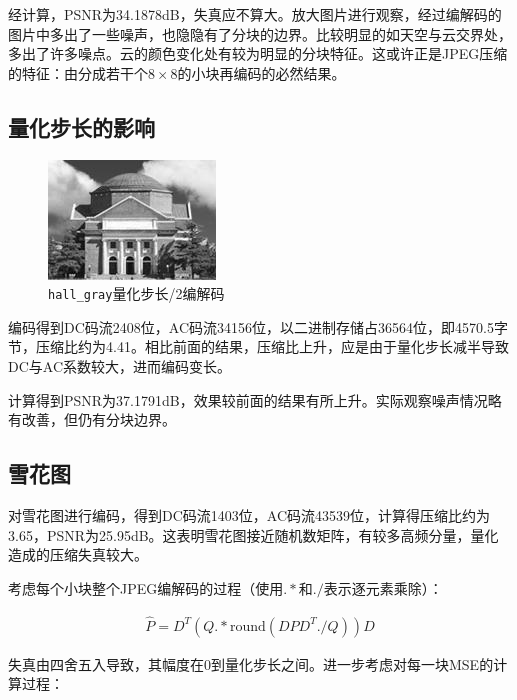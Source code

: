 \documentclass[10pt, a4paper]{article}
\begin{document}
经计算，PSNR为34.1878dB，失真应不算大。放大图片进行观察，经过编解码的图片中多出了一些噪声，也隐隐有了分块的边界。比较明显的如天空与云交界处，多出了许多噪点。云的颜色变化处有较为明显的分块特征。这或许正是JPEG压缩的特征：由分成若干个$8\times 8$的小块再编码的必然结果。

\subsection{量化步长的影响}

\begin{figure}[h]
    \centering
    \includegraphics[width=.6\textwidth]{"../assets/2_12_decode.png"}
    \caption{\texttt{hall_gray}量化步长/2编解码}
    \label{fig:exp2_12}
\end{figure}

编码得到DC码流2408位，AC码流34156位，以二进制存储占36564位，即4570.5字节，压缩比约为4.41。相比前面的结果，压缩比上升，应是由于量化步长减半导致DC与AC系数较大，进而编码变长。

计算得到PSNR为37.1791dB，效果较前面的结果有所上升。实际观察噪声情况略有改善，但仍有分块边界。

\subsection{雪花图}

对雪花图进行编码，得到DC码流1403位，AC码流43539位，计算得压缩比约为3.65，PSNR为25.95dB。这表明雪花图接近随机数矩阵，有较多高频分量，量化造成的压缩失真较大。

考虑每个小块整个JPEG编解码的过程（使用$.*$和$./$表示逐元素乘除）：

\begin{align*}
    \hat{P} = D^T (Q .* \text{round}(DPD^T ./ Q)) D
\end{align*}

失真由四舍五入导致，其幅度在0到量化步长之间。进一步考虑对每一块MSE的计算过程：
\end{document}
